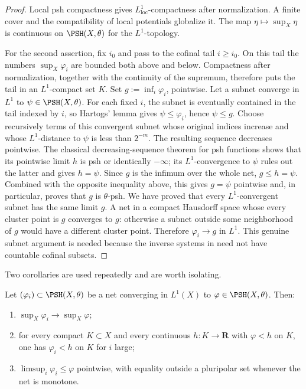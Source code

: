 \begin{proof}
Local psh compactness gives \(L^1_{\mathrm{loc}}\)-compactness after
normalization.  A finite cover and the compatibility of local potentials
globalize it.  The map
\(\eta\mapsto\sup_X\eta\) is continuous on
\(\PSH(X,\theta)\) for the \(L^1\)-topology.

For the second assertion, fix \(i_0\) and pass to the cofinal tail
\(i\geq i_0\).  On this tail the numbers \(\sup_X\varphi_i\) are bounded
both above and below.  Compactness after normalization, together with
the continuity of the supremum, therefore puts the tail in an
\(L^1\)-compact set \(K\).
Set \(g:=\inf_i\varphi_i\), pointwise.  Let a subnet converge in
\(L^1\) to \(\psi\in\PSH(X,\theta)\).  For each fixed \(i\), the subnet
is eventually contained in the tail indexed by \(i\), so Hartogs'
lemma gives \(\psi\leq\varphi_i\), hence \(\psi\leq g\).
Choose recursively terms of this convergent subnet whose original
indices increase and whose \(L^1\)-distance to \(\psi\) is less than
\(2^{-m}\).  The resulting sequence decreases pointwise.  The classical
decreasing-sequence theorem for psh functions shows that its pointwise
limit \(h\) is psh or identically \(-\infty\); its \(L^1\)-convergence
to \(\psi\) rules out the latter and gives \(h=\psi\).  Since \(g\) is
the infimum over the whole net, \(g\leq h=\psi\).  Combined with the
opposite inequality above, this gives \(g=\psi\) pointwise and, in
particular, proves that \(g\) is \(\theta\)-psh.  We have proved that every
\(L^1\)-convergent subnet has the same limit \(g\).  A net in a compact
Hausdorff space whose every cluster point is \(g\) converges to \(g\):
otherwise a subnet outside some neighborhood of \(g\) would have a
different cluster point.  Therefore \(\varphi_i\to g\) in \(L^1\).
This genuine subnet argument is needed because the inverse systems in
 need not have countable
cofinal subsets.
\end{proof}

Two corollaries are used repeatedly and are worth isolating.

\begin{corollary}\label{cor:ch51-hartogs}
Let \((\varphi_i)\subset\PSH(X,\theta)\) be a net converging in
\(L^1(X)\) to \(\varphi\in\PSH(X,\theta)\).  Then:
\begin{enumerate}
\item\label{itm:ch51-hartogs:sup}
      \(\sup_X\varphi_i\to\sup_X\varphi\);
\item\label{itm:ch51-hartogs:hartogs}
      for every compact \(K\subset X\) and every continuous
      \(h:K\to\mathbf R\) with \(\varphi<h\) on \(K\), one has
      \(\varphi_i<h\) on \(K\) for \(i\) large;
\item\label{itm:ch51-hartogs:limsup}
      \(\limsup_i\varphi_i\leq\varphi\) pointwise, with equality outside a
      pluripolar set whenever the net is monotone.
\end{enumerate}
\end{corollary}

